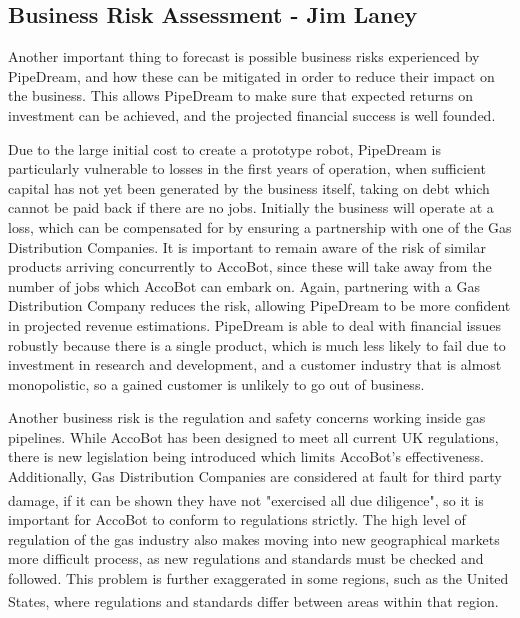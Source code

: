 \documentclass[11pt]{article}		%
\newcommand{\supercite}[1]{\textsuperscript{\cite{#1}}}		%
\begin{document}
            
           
			    
		\subsection[Business Risk Assessment]{Business Risk Assessment - Jim Laney}
		     	
		     	Another important thing to forecast is possible business risks experienced by PipeDream, and how these can be mitigated in order to reduce their impact on the business.
		     	This allows PipeDream to make sure that expected returns on investment can be achieved, and the projected financial success is well founded.
		     	
		     	Due to the large initial cost to create a prototype robot, PipeDream is particularly vulnerable to losses in the first years of operation, when sufficient capital has not yet been generated by the business itself, taking on debt which cannot be paid back if there are no jobs.
		     	Initially the business will operate at a loss, which can be compensated for by ensuring a partnership with one of the Gas Distribution Companies.
		     	It is important to remain aware of the risk of similar products arriving concurrently to AccoBot, since these will take away from the number of jobs which AccoBot can embark on.
		     	Again, partnering with a Gas Distribution Company reduces the risk, allowing PipeDream to be more confident in projected revenue estimations.
		     	PipeDream is able to deal with financial issues robustly because there is a single product, which is much less likely to fail due to investment in research and development, and a customer industry that is almost monopolistic, so a gained customer is unlikely to go out of business.
		     	
		     	Another business risk is the regulation and safety concerns working inside gas pipelines.
		     	While AccoBot has been designed to meet all current UK regulations, there is new legislation being introduced which limits AccoBot's effectiveness.
		     	Additionally, Gas Distribution Companies are considered at fault for third party damage, if it can be shown they have not "exercised all due diligence"\supercite{hse1996guide}, so it is important for AccoBot to conform to regulations strictly.
		     	The high level of regulation of the gas industry also makes moving into new geographical markets more difficult process, as new regulations and standards must be checked and followed.
		     	This problem is further exaggerated in some regions, such as the United States, where regulations and standards differ between areas within that region\supercite{pless2011making}.
		     	
\end{document}
